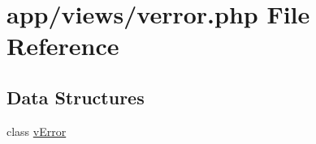 \hypertarget{verror_8php}{}\section{app/views/verror.php File Reference}
\label{verror_8php}
\subsection*{Data Structures}
\begin{DoxyCompactItemize}
\item 
class \hyperlink{classvError}{v\+Error}
\end{DoxyCompactItemize}
